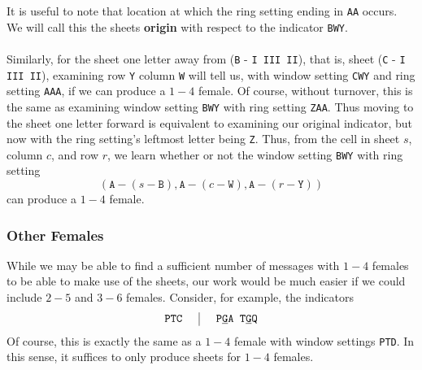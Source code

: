 \noindent It is useful to note that location at which
the ring setting ending in \texttt{AA} occurs. We will call this the
sheets {\bf{origin}} with respect to the indicator \texttt{BWY}.
\\\\Similarly, for the sheet one letter away from (\texttt{B} -
\texttt{I III II}), that is, sheet (\texttt{C} - \texttt{I III II}),
examining row \texttt{Y} column \texttt{W} will tell us, with
window setting \texttt{CWY} and ring setting \texttt{AAA}, if we can
produce a $1-4$ female. Of course, without turnover, this is the same
as examining window setting \texttt{BWY} with ring setting
\texttt{ZAA}. Thus moving to the sheet one letter forward is
equivalent to examining our original indicator, but now with the ring
setting's leftmost letter being \texttt{Z}. Thus, from the cell in sheet
$s$, column $c$, and row $r$, we learn whether or not the window
setting \texttt{BWY} with ring setting
\[
  (\texttt{A} - (s - \texttt{B}), \texttt{A} - (c -\texttt{W}),
  \texttt{A} - (r -\texttt{Y}))
\]
can produce a $1-4$ female.

\subsubsection{Other Females} While we may be able to find a
sufficient number of messages with $1-4$ females to be able to make
use of the sheets, our work would be much easier if we could include
$2-5$ and $3-6$ females. Consider, for example, the indicators
\[
  \setlength{\arraycolsep}{15pt}
  \begin{array}{c | c}
    \texttt{PTC} & \texttt{P}{\uline{\texttt{G}}}\texttt{A
    T}{\uline{\texttt{G}}}\texttt{Q}
  \end{array}
\]
Of course, this is exactly the same as a $1-4$ female with window
settings \texttt{PTD}. In this sense, it suffices to only produce
sheets for $1-4$ females.
